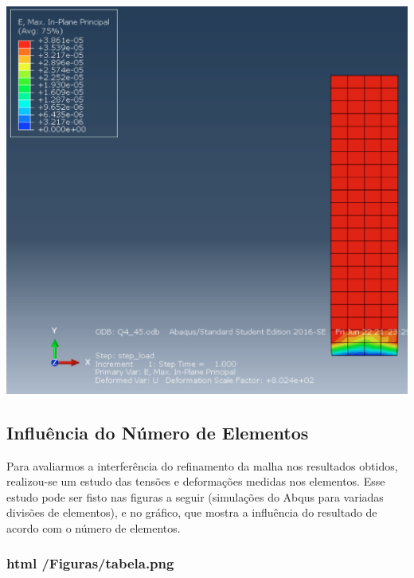 \begin{DoxyImageNoCaption}
  \mbox{\includegraphics[width=\textwidth,height=\textheight/2,keepaspectratio=true]{45E.png}}
\end{DoxyImageNoCaption}
 

\subsection*{Influência do Número de Elementos}


\begin{DoxyItemize}
\item Para avaliarmos a interferência do refinamento da malha nos resultados obtidos, realizou-\/se um estudo das tensões e deformações medidas nos elementos. Esse estudo pode ser fisto nas figuras a seguir (simulações do Abqus para variadas divisões de elementos), e no gráfico, que mostra a influência do resultado de acordo com o número de elementos.
\end{DoxyItemize}

\subsubsection*{html /\+Figuras/tabela.png}



